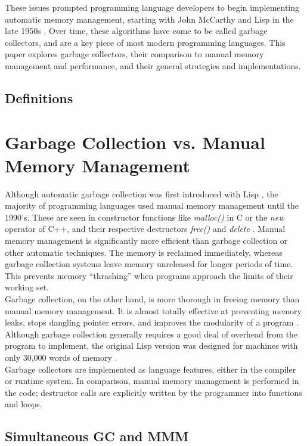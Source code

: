 \documentclass[12pt]{article}
\begin{document}
These issues prompted programming language developers to begin implementing automatic memory management, starting with John McCarthy and Lisp in the late 1950s \cite{https://www.seas.harvard.edu/courses/cs252/2016fa/16.pdf}. Over time, these algorithms have come to be called garbage collectors, and are a key piece of most modern programming languages. This paper explores garbage collectors, their comparison to manual memory management and performance, and their general strategies and implementations. 

\subsection{Definitions}
\section{Garbage Collection vs. Manual Memory Management}
Although automatic garbage collection was first introduced with Lisp \cite{chis11}, the majority of programming languages used manual memory management until the 1990's. These are seen in constructor functions like \textit{malloc()} in C or the \textit{new} operator of C++, and their respective destructors \textit{free()} and \textit{delete} \cite{pythDocs}. Manual memory management is significantly more efficient than garbage collection or other automatic techniques. The memory is reclaimed immediately, whereas garbage collection systems leave memory unreleased for longer periods of time. This prevents memory ``thrashing'' when programs approach the limits of their working set.\\

Garbage collection, on the other hand, is more thorough in freeing memory than manual memory management. It is almost totally effective at preventing memory leaks, stops dangling pointer errors, and improves the modularity of a program \cite{hertz05}. Although garbage collection generally requires a good deal of overhead from the program to implement, the original Lisp version was designed for machines with only 30,000 words of memory \cite{chis11}.\\

Garbage collectors are implemented as language features, either in the compiler or runtime system. In comparison, manual memory management is performed in the code; destructor calls are explicitly written by the programmer into functions and loops.
\subsection{Simultaneous GC and MMM}
\end{document}
